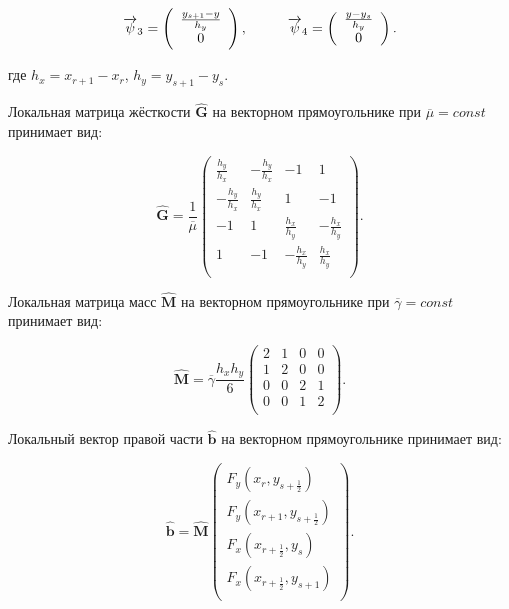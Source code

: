 \begin{equation*}
	\overrightarrow{\psi}_3 = \left(
	\begin{array}{c}
		\frac{y_{s + 1} - y}{h_y}\\
		0\\
	\end{array}
	\right),
	\hspace{10mm}
	\overrightarrow{\psi}_4 = \left(
	\begin{array}{c}
		\frac{y - y_s}{h_y}\\
		0\\
	\end{array}
	\right).
\end{equation*}

где $h_x = x_{r + 1} - x_r$, $h_y = y_{s + 1} - y_s$.

Локальная матрица жёсткости $\hat{\textbf{G}}$ на векторном прямоугольнике при $\overline{\mu} = const$ принимает вид:

\begin{equation*}
	\hat{\textbf{G}} = \frac{1}{\overline{\mu}} \left(
	\begin{array}{rrrr}
		\frac{h_y}{h_x} & -\frac{h_y}{h_x} & -1 & 1 \\
		-\frac{h_y}{h_x} & \frac{h_y}{h_x} & 1 & -1 \\
		-1 & 1 & \frac{h_x}{h_y} & -\frac{h_x}{h_y} \\
		 1 & -1 & -\frac{h_x}{h_y} & \frac{h_x}{h_y} \\
	\end{array}
	\right).
\end{equation*}

Локальная матрица масс $\hat{\textbf{M}}$ на векторном прямоугольнике при $\overline{\gamma} = const$ принимает вид:

\begin{equation*}
	\hat{\textbf{M}} = \overline{\gamma}\frac{h_x h_y}{6} \left(
	\begin{array}{rrrr}
		2 & 1 & 0 & 0 \\
		1 & 2 & 0 & 0 \\
		0 & 0 & 2 & 1 \\
		0 & 0 & 1 & 2 \\
	\end{array}
	\right).
\end{equation*}

Локальный вектор правой части $\hat{\textbf{b}}$ на векторном прямоугольнике принимает вид:

\begin{equation*}
	\hat{\textbf{b}} = \hat{\textbf{M}} \left(
	\begin{array}{r}
		F_y(x_r, y_{s+\frac{1}{2}}) \\
		F_y(x_{r+1}, y_{s+\frac{1}{2}}) \\
		F_x(x_{r+\frac{1}{2}}, y_s)  \\
		F_x(x_{r+\frac{1}{2}}, y_{s+1})  \\
	\end{array}
	\right).
\end{equation*}


